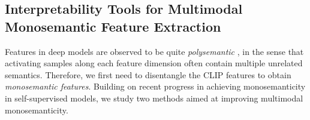 


\subsection{Interpretability Tools for Multimodal Monosemantic Feature Extraction}
Features in deep models are observed to be quite \emph{polysemantic} \citep{olah2020zoom}, in the sense that activating samples along each feature dimension often contain multiple unrelated semantics. Therefore, we first need to disentangle the CLIP features to obtain \emph{monosemantic features}. Building on recent progress in achieving monosemanticity in self-supervised models, we study two methods aimed at improving multimodal monosemanticity.


